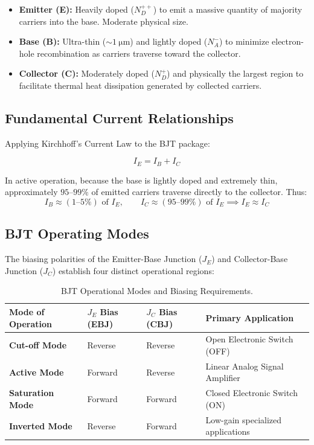 \begin{itemize}
    \item \textbf{Emitter (E):} Heavily doped ($N_D^{++}$) to emit a massive quantity of majority carriers into the base. Moderate physical size.
    \item \textbf{Base (B):} Ultra-thin ($\sim \SI{1}{\micro\meter}$) and lightly doped ($N_A^-$) to minimize electron-hole recombination as carriers traverse toward the collector.
    \item \textbf{Collector (C):} Moderately doped ($N_D^+$) and physically the largest region to facilitate thermal heat dissipation generated by collected carriers.
\end{itemize}

\subsection{Fundamental Current Relationships}
Applying Kirchhoff's Current Law to the BJT package:
\begin{keyequation}
\begin{equation}
    I_E = I_B + I_C
\end{equation}
\end{keyequation}
In active operation, because the base is lightly doped and extremely thin, approximately $95\text{--}99\%$ of emitted carriers traverse directly to the collector. Thus:
\begin{equation}
    I_B \approx (1\text{--}5\%)\text{ of } I_E, \qquad I_C \approx (95\text{--}99\%)\text{ of } I_E \implies I_E \approx I_C
\end{equation}

\subsection{BJT Operating Modes}
The biasing polarities of the Emitter-Base Junction ($J_E$) and Collector-Base Junction ($J_C$) establish four distinct operational regions:

\begin{table}[htbp]
\centering
\small
\begin{tabularx}{\textwidth}{lXXl}
\toprule
\textbf{Mode of Operation} & \textbf{$J_E$ Bias (EBJ)} & \textbf{$J_C$ Bias (CBJ)} & \textbf{Primary Application} \\
\midrule
\textbf{Cut-off Mode} & Reverse & Reverse & Open Electronic Switch (OFF) \\
\textbf{Active Mode} & Forward & Reverse & Linear Analog Signal Amplifier \\
\textbf{Saturation Mode} & Forward & Forward & Closed Electronic Switch (ON) \\
\textbf{Inverted Mode} & Reverse & Forward & Low-gain specialized applications \\
\bottomrule
\end{tabularx}
\caption{BJT Operational Modes and Biasing Requirements.}
\label{tab:bjt-modes}
\end{table}

